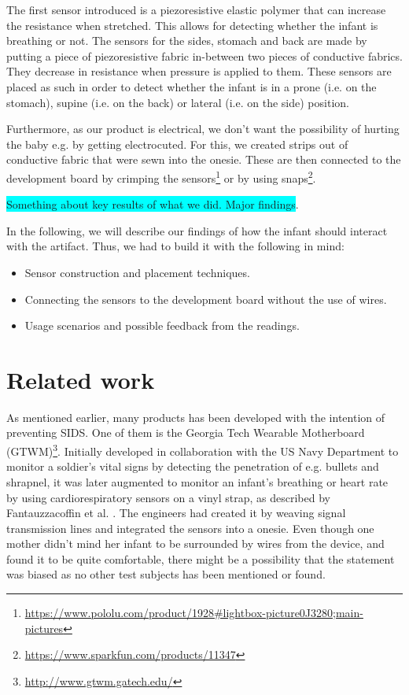 \documentclass{sigchi-ext}
\begin{document}
The first sensor introduced is a piezoresistive elastic polymer that can increase the resistance when stretched. This allows for detecting whether the infant is breathing or not. The sensors for the sides, stomach and back are made by putting a piece of piezoresistive fabric in-between two pieces of conductive fabrics. They decrease in resistance when pressure is applied to them. These sensors are placed as such in order to detect whether the infant is in a prone (i.e. on the stomach), supine (i.e. on the back) or lateral (i.e. on the side) position.

Furthermore, as our product is electrical, we don't want the possibility of hurting the baby e.g. by getting electrocuted. For this, we created strips out of conductive fabric that were sewn into the onesie. These are then connected to the development board by crimping the sensors\footnote{\url{https://www.pololu.com/product/1928\#lightbox-picture0J3280;main-pictures}} or by using snaps\footnote{\url{https://www.sparkfun.com/products/11347}}.

\colorbox{cyan}{Something about key results of what we did. Major findings}.

In the following, we will describe our findings of how the infant should interact with the artifact. Thus, we had to build it with the following in mind:
\begin{itemize}
  \item Sensor construction and placement techniques.
  \item Connecting the sensors to the development board without the use of wires.
  \item Usage scenarios and possible feedback from the readings.
\end{itemize}

\section{Related work}
As mentioned earlier, many products has been developed with the intention of preventing SIDS. One of them is the Georgia Tech Wearable Motherboard (GTWM)\footnote{\url{http://www.gtwm.gatech.edu/}}. Initially developed in collaboration with the US Navy Department to monitor a soldier's vital signs by detecting the penetration of e.g. bullets and shrapnel, it was later augmented to monitor an infant's breathing or heart rate by using cardiorespiratory sensors on a vinyl strap, as described by Fantauzzacoffin et al. \cite{p285-fantauzzacoffin}. The engineers had created it by weaving signal transmission lines and integrated the sensors into a onesie. Even though one mother didn't mind her infant to be surrounded by wires from the device, and found it to be quite comfortable, there might be a possibility that the statement was biased as no other test subjects has been mentioned or found.
\end{document}
